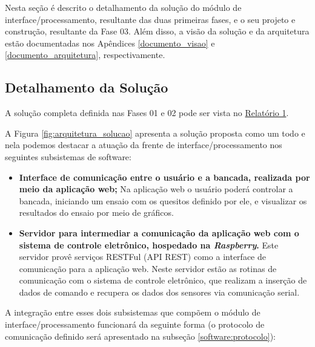 \label{desenvolvimento_processamento}

Nesta seção é descrito o detalhamento da solução do módulo de interface/processamento, resultante das duas primeiras fases,
e o seu projeto e construção, resultante da Fase 03.
Além disso, a visão da solução e da arquitetura estão documentadas nos Apêndices \ref{documento_visao} e \ref{documento_arquitetura}, respectivamente.

\subsection{Detalhamento da Solução} \label{software:detalhamento_solucao}

A solução completa definida nas Fases 01 e 02 pode ser vista no \href{https://drive.google.com/file/d/0B5InkGKx6O-MR1B3eVYzZFpjQ3c/view?usp=sharing}{Relatório 1}.

A Figura \ref{fig:arquitetura_solucao} apresenta a solução proposta como um todo e nela podemos destacar a atuação da
frente de interface/processamento nos seguintes subsistemas de software:

\begin{itemize}
 \item \textbf{Interface de comunicação entre o usuário e a bancada, realizada por meio da aplicação web;}
      \subitem Na aplicação web o usuário poderá controlar a bancada, iniciando um ensaio com os quesitos definido por ele,
	       e visualizar os resultados do ensaio por meio de gráficos.
 \item \textbf{Servidor para intermediar a comunicação da aplicação web com o sistema de controle eletrônico, hospedado na \textit{Raspberry}.}
      \subitem Este servidor provê serviços RESTFul (API REST) como a interface de comunicação para a aplicação web. Neste servidor estão as 
	       rotinas de comunicação com o sistema de controle eletrônico, que realizam a inserção de dados de comando e recupera os dados 
	       dos sensores via comunicação serial.
\end{itemize}

A integração entre esses dois subsistemas que compõem o módulo de interface/processamento funcionará da seguinte forma
(o protocolo de comunicação definido será apresentado na subseção \ref{software:protocolo}):

